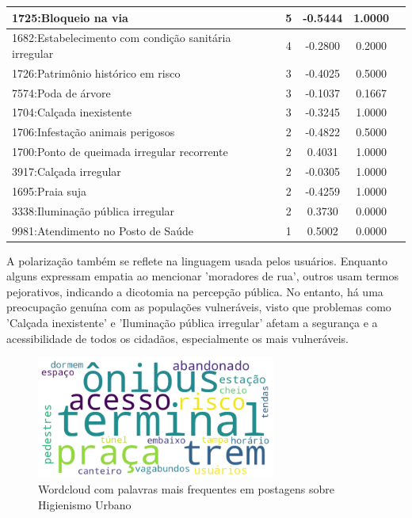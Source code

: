 \begin{table}[htbp]
\begin{tabular}{|l|c|c|c|c|}
		\hline
		1725:Bloqueio na via                                  & 5                & -0.5444        & 1.0000           \\
		\hline
		1682:Estabelecimento com condição sanitária irregular & 4                & -0.2800        & 0.2000           \\
		\hline
		1726:Patrimônio histórico em risco                    & 3                & -0.4025        & 0.5000           \\
		\hline
		7574:Poda de árvore                                   & 3                & -0.1037        & 0.1667           \\
		\hline
		1704:Calçada inexistente                              & 3                & -0.3245        & 1.0000           \\
		\hline
		1706:Infestação animais perigosos                     & 2                & -0.4822        & 0.5000           \\
		\hline
		1700:Ponto de queimada irregular recorrente           & 2                & 0.4031         & 1.0000           \\
		\hline
		3917:Calçada irregular                                & 2                & -0.0305        & 1.0000           \\
		\hline
		1695:Praia suja                                       & 2                & -0.4259        & 1.0000           \\
		\hline
		3338:Iluminação pública irregular                     & 2                & 0.3730         & 0.0000           \\
		\hline
		9981:Atendimento no Posto de Saúde                    & 1                & 0.5002         & 0.0000           \\
		\hline
	\end{tabular}
\end{table}

A polarização também se reflete na linguagem usada pelos usuários. Enquanto alguns expressam empatia ao mencionar 'moradores de rua', outros usam termos pejorativos, indicando a dicotomia na percepção pública. No entanto, há uma preocupação genuína com as populações vulneráveis, visto que problemas como 'Calçada inexistente' e 'Iluminação pública irregular' afetam a segurança e a acessibilidade de todos os cidadãos, especialmente os mais vulneráveis.

\begin{figure}[htb]
	\centering
	\includegraphics[width=0.7\textwidth]{images/wordcloud_homepand.png}
	\caption{Wordcloud com palavras mais frequentes em postagens sobre Higienismo Urbano}
	\label{fig:wordcloud_homepand}
\end{figure}

